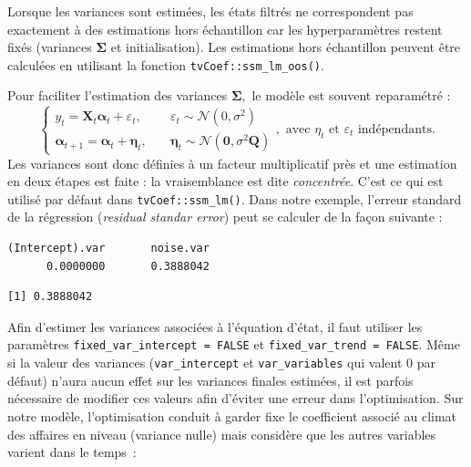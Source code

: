 \documentclass[
  a4paper,
  DIV=11,
  numbers=noendperiod,
  french]{scrartcl}
\newenvironment{Shaded}{\begin{snugshade}}{\end{snugshade}}
\newcommand{\FunctionTok}[1]{\textcolor[rgb]{0.28,0.35,0.67}{#1}}
\newcommand{\NormalTok}[1]{\textcolor[rgb]{0.00,0.23,0.31}{#1}}
\newcommand{\SpecialCharTok}[1]{\textcolor[rgb]{0.37,0.37,0.37}{#1}}
\newcommand\1{{\mathds 1}}
\newcommand{\bf}[1]{{\boldsymbol #1}}
\theoremstyle{remark}
\begin{document}
Lorsque les variances sont estimées, les états filtrés ne correspondent
pas exactement à des estimations hors échantillon car les
hyperparamètres restent fixés (variances \(\bf\Sigma\) et
initialisation). Les estimations hors échantillon peuvent être calculées
en utilisant la fonction \texttt{tvCoef::ssm\_lm\_oos()}.

Pour faciliter l'estimation des variances \(\bf\Sigma,\) le modèle est
souvent reparamétré : \[
\begin{cases}
y_t={\bf X_t}\bf\alpha_t+\varepsilon_t,\quad&\varepsilon_t\sim\mathcal N(0,\sigma^2)\\
\bf\alpha_{t+1}=\bf\alpha_t+\bf\eta_t,\quad&\bf\eta_t\sim\mathcal N(\bf 0,\sigma^2\bf Q)
\end{cases},\text{ avec }\eta_t\text{ et }\varepsilon_t\text{ indépendants.}
\] Les variances sont donc définies à un facteur multiplicatif près et
une estimation en deux étapes est faite : la vraisemblance est dite
\emph{concentrée}. C'est ce qui est utilisé par défaut dans
\texttt{tvCoef::ssm\_lm()}. Dans notre exemple, l'erreur standard de la
régression (\emph{residual standar error}) peut se calculer de la façon
suivante :

\begin{Shaded}
\end{Shaded}

\begin{verbatim}
(Intercept).var       noise.var 
      0.0000000       0.3888042 
\end{verbatim}

\begin{Shaded}
\end{Shaded}

\begin{verbatim}
[1] 0.3888042
\end{verbatim}

Afin d'estimer les variances associées à l'équation d'état, il faut
utiliser les paramètres \texttt{fixed\_var\_intercept\ =\ FALSE} et
\texttt{fixed\_var\_trend\ =\ FALSE}. Même si la valeur des variances
(\texttt{var\_intercept} et \texttt{var\_variables} qui valent 0 par
défaut) n'aura aucun effet sur les variances finales estimées, il est
parfois nécessaire de modifier ces valeurs afin d'éviter une erreur dans
l'optimisation. Sur notre modèle, l'optimisation conduit à garder fixe
le coefficient associé au climat des affaires en niveau (variance nulle)
mais considère que les autres variables varient dans le temps~:
\end{document}

